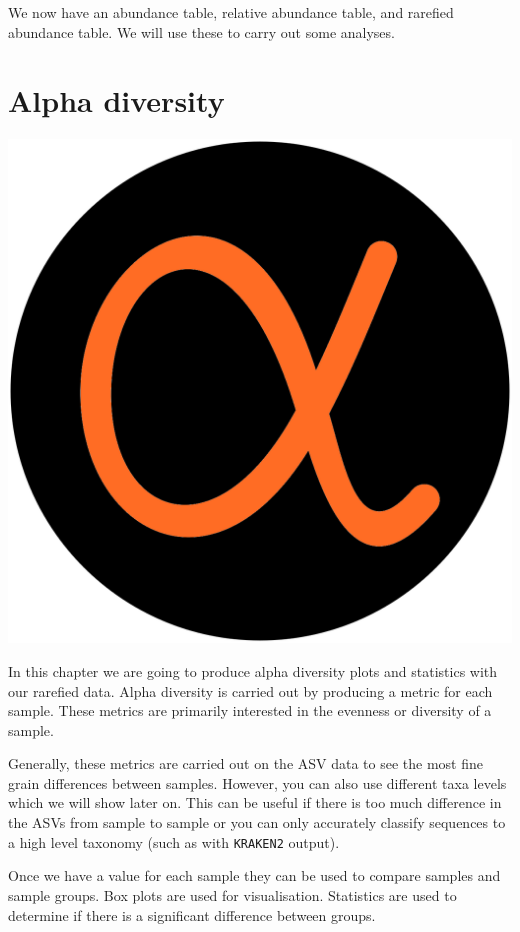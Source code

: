\documentclass[
]{book}
\begin{document}
We now have an abundance table, relative abundance table, and rarefied abundance table. We will use these to carry out some analyses.

\hypertarget{alpha_chap}{%
\chapter{Alpha diversity}\label{alpha_chap}}

\includegraphics{figures/alpha.png}

In this chapter we are going to produce alpha diversity plots and statistics with our rarefied data.
Alpha diversity is carried out by producing a metric for each sample.
These metrics are primarily interested in the evenness or diversity of a sample.

Generally, these metrics are carried out on the ASV data to see the most fine grain differences between samples.
However, you can also use different taxa levels which we will show later on.
This can be useful if there is too much difference in the ASVs from sample to sample or you can only accurately classify sequences to a high level taxonomy (such as with \texttt{KRAKEN2} output).

Once we have a value for each sample they can be used to compare samples and sample groups.
Box plots are used for visualisation.
Statistics are used to determine if there is a significant difference between groups.
\end{document}
